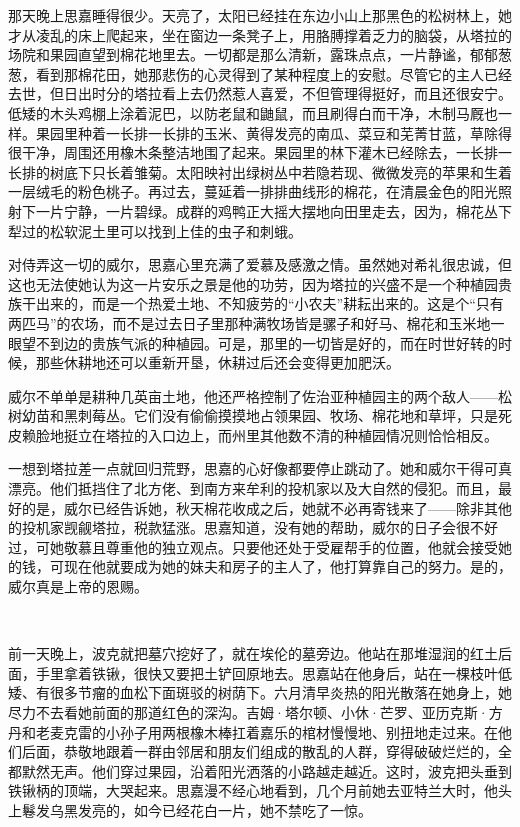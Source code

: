 \par 那天晚上思嘉睡得很少。天亮了，太阳已经挂在东边小山上那黑色的松树林上，她才从凌乱的床上爬起来，坐在窗边一条凳子上，用胳膊撑着乏力的脑袋，从塔拉的场院和果园直望到棉花地里去。一切都是那么清新，露珠点点，一片静谧，郁郁葱葱，看到那棉花田，她那悲伤的心灵得到了某种程度上的安慰。尽管它的主人已经去世，但日出时分的塔拉看上去仍然惹人喜爱，不但管理得挺好，而且还很安宁。低矮的木头鸡棚上涂着泥巴，以防老鼠和鼬鼠，而且刷得白而干净，木制马厩也一样。果园里种着一长排一长排的玉米、黄得发亮的南瓜、菜豆和芜菁甘蓝，草除得很干净，周围还用橡木条整洁地围了起来。果园里的林下灌木已经除去，一长排一长排的树底下只长着雏菊。太阳映衬出绿树丛中若隐若现、微微发亮的苹果和生着一层绒毛的粉色桃子。再过去，蔓延着一排排曲线形的棉花，在清晨金色的阳光照射下一片宁静，一片碧绿。成群的鸡鸭正大摇大摆地向田里走去，因为，棉花丛下犁过的松软泥土里可以找到上佳的虫子和刺蛾。
\par 对侍弄这一切的威尔，思嘉心里充满了爱慕及感激之情。虽然她对希礼很忠诚，但这也无法使她认为这一片安乐之景是他的功劳，因为塔拉的兴盛不是一个种植园贵族干出来的，而是一个热爱土地、不知疲劳的“小农夫”耕耘出来的。这是个“只有两匹马”的农场，而不是过去日子里那种满牧场皆是骡子和好马、棉花和玉米地一眼望不到边的贵族气派的种植园。可是，那里的一切皆是好的，而在时世好转的时候，那些休耕地还可以重新开垦，休耕过后还会变得更加肥沃。
\par 威尔不单单是耕种几英亩土地，他还严格控制了佐治亚种植园主的两个敌人——松树幼苗和黑刺莓丛。它们没有偷偷摸摸地占领果园、牧场、棉花地和草坪，只是死皮赖脸地挺立在塔拉的入口边上，而州里其他数不清的种植园情况则恰恰相反。
\par 一想到塔拉差一点就回归荒野，思嘉的心好像都要停止跳动了。她和威尔干得可真漂亮。他们抵挡住了北方佬、到南方来牟利的投机家以及大自然的侵犯。而且，最好的是，威尔已经告诉她，秋天棉花收成之后，她就不必再寄钱来了——除非其他的投机家觊觎塔拉，税款猛涨。思嘉知道，没有她的帮助，威尔的日子会很不好过，可她敬慕且尊重他的独立观点。只要他还处于受雇帮手的位置，他就会接受她的钱，可现在他就要成为她的妹夫和房子的主人了，他打算靠自己的努力。是的，威尔真是上帝的恩赐。
\par  
\par 前一天晚上，波克就把墓穴挖好了，就在埃伦的墓旁边。他站在那堆湿润的红土后面，手里拿着铁锹，很快又要把土铲回原地去。思嘉站在他身后，站在一棵枝叶低矮、有很多节瘤的血松下面斑驳的树荫下。六月清早炎热的阳光散落在她身上，她尽力不去看她前面的那道红色的深沟。吉姆·塔尔顿、小休·芒罗、亚历克斯·方丹和老麦克雷的小孙子用两根橡木棒扛着嘉乐的棺材慢慢地、别扭地走过来。在他们后面，恭敬地跟着一群由邻居和朋友们组成的散乱的人群，穿得破破烂烂的，全都默然无声。他们穿过果园，沿着阳光洒落的小路越走越近。这时，波克把头垂到铁锹柄的顶端，大哭起来。思嘉漫不经心地看到，几个月前她去亚特兰大时，他头上鬈发乌黑发亮的，如今已经花白一片，她不禁吃了一惊。
